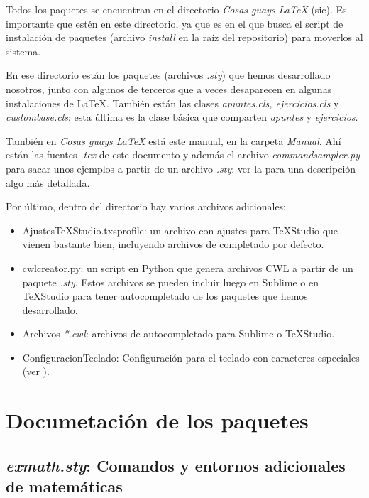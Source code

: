 Todos los paquetes se encuentran en el directorio \textit{Cosas guays LaTeX} (sic). Es importante que estén en este directorio, ya que es en el que busca el script de instalación de paquetes (archivo \textit{install} en la raíz del repositorio) para moverlos al sistema.

En ese directorio están los paquetes (archivos \textit{.sty}) que hemos desarrollado nosotros, junto con algunos de terceros que a veces desaparecen en algunas instalaciones de \LaTeX. También están las clases \textit{apuntes.cls, ejercicios.cls} y \textit{custombase.cls}: esta última es la clase básica que comparten \textit{apuntes} y \textit{ejercicios}.

También en \textit{Cosas guays LaTeX} está este manual, en la carpeta \textit{Manual}. Ahí están las fuentes \textit{.tex} de este documento y además el archivo \textit{commandsampler.py} para sacar unos ejemplos a partir de un archivo \textit{.sty}: ver la  para una descripción algo más detallada.

Por último, dentro del directorio hay varios archivos adicionales:

\begin{itemize}
\item AjustesTeXStudio.txsprofile: un archivo con ajustes para TeXStudio que vienen bastante bien, incluyendo archivos de completado por defecto.
\item {} cwlcreator.py: un script en Python que genera archivos CWL a partir de un paquete \textit{.sty}. Estos archivos se pueden incluir luego en Sublime o en TeXStudio para tener autocompletado de los paquetes que hemos desarrollado.
\item Archivos \textit{*.cwl}: archivos de autocompletado para Sublime o TeXStudio.
\item ConfiguracionTeclado: Configuración para el teclado con caracteres especiales (ver ).
\end{itemize}

\section{Documetación de los paquetes}

\subsection{\textit{exmath.sty}: Comandos y entornos adicionales de matemáticas}
\label{sec:Exmath}

